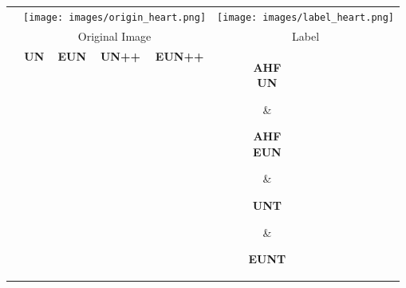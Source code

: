 \documentclass[runningheads]{llncs}
\begin{document}
\begin{figure}[p]
\begin{minipage}{\textwidth}
\centering
\setlength{\tabcolsep}{1pt} 
\begin{tabular}{ccccccccc}
 & \multicolumn{4}{c}{\texttt{[image: images/origin\_heart.png]}} & \multicolumn{4}{c}{\texttt{[image: images/label\_heart.png]}}\\
 &\multicolumn{4}{c}{Original Image} & \multicolumn{4}{c}{Label}\\
\toprule
& \textbf{UN} & \textbf{EUN} & \textbf{UN++} & \textbf{EUN++} & 
\parbox{1.2cm}{\centering \textbf{AHF\\UN}} & 
\parbox{1.2cm}{\centering \textbf{AHF\\EUN}} & 
\parbox{1.2cm}{\centering \textbf{UNT}} & 
\parbox{1.2cm}{\centering \textbf{EUNT}}\\
\midrule
{} &
\texttt{[image: images/UNet\_Heart\_segmentation.png]} &
\texttt{[image: images/UNetMHEX\_Heart\_segmentation.png]} &
\texttt{[image: images/UNetPP\_Heart\_segmentation.png]} &
\texttt{[image: images/UNetPP\_MHEX\_Heart\_segmentation.png]} &
\texttt{[image: images/UAFF\_Heart\_segmentation.png]} &
\texttt{[image: images/UAFF\_MHEX\_Heart\_segmentation.png]} &
\texttt{[image: images/TransformerUNet\_Heart\_segmentation.png]} &
\texttt{[image: images/TransUNetMHEX\_Heart\_segmentation.png]}\\
\rule{0pt}{2pt}
&
\texttt{[image: images/UNet\_Heart\_segmentation\_uncertainty.png]} &
\texttt{[image: images/UNetMHEX\_Heart\_segmentation\_uncertainty.png]} &
\texttt{[image: images/UNetPP\_Heart\_segmentation\_uncertainty.png]} &
\texttt{[image: images/UNetPP\_MHEX\_Heart\_segmentation\_uncertainty.png]} &
\texttt{[image: images/UAFF\_Heart\_segmentation\_uncertainty.png]} &
\texttt{[image: images/UAFF\_MHEX\_Heart\_segmentation\_uncertainty.png]} &
\texttt{[image: images/TransformerUNet\_Heart\_segmentation\_uncertainty.png]} &
\texttt{[image: images/TransUNetMHEX\_Heart\_segmentation\_uncertainty.png]}\\
&
\texttt{[image: images/UNet\_Heart\_grad\_CAM.png]} &

\end{tabular}
\end{minipage}
\end{figure}
\end{document}
